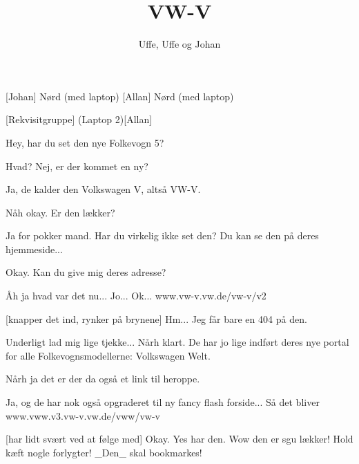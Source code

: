 \documentclass[a4paper,11pt]{article}
\title{VW-V}
\author{Uffe, Uffe og Johan}
\begin{document}
\maketitle

\begin{roles}
[Johan] Nørd (med laptop)
[Allan] Nørd (med laptop)
\end{roles}

\begin{props}
[Rekvisitgruppe]
\prop(Laptop 2)[Allan]
\end{props}

  
\begin{sketch}


 Hey, har du set den nye Folkevogn 5?

 Hvad? Nej, er der kommet en ny?

 Ja, de kalder den Volkswagen V, altså VW-V.

 Nåh okay. Er den lækker?

 Ja for pokker mand. Har du virkelig ikke set den? Du kan se den på
deres hjemmeside...

 Okay. Kan du give mig deres adresse?


 Åh ja hvad var det nu...  Jo... Ok...
www.vw-v.vw.de/vw-v/v2 

[knapper det ind, rynker på brynene] Hm... Jeg får bare en 404 på den.

 Underligt lad mig lige tjekke...  Nårh klart.
De har jo lige indført deres nye portal for alle Folkevognsmodellerne:
Volkswagen Welt.

 Nårh ja det er der da også et link til heroppe.


 Ja, og de har nok også opgraderet til ny fancy flash forside... Så
det bliver www.vww.v3.vw-v.vw.de/vww/vw-v

[har lidt svært ved at følge med] Okay. Yes har den. Wow den er sgu
lækker! Hold kæft nogle forlygter! \_Den\_ skal bookmarkes!


\end{sketch}
\end{document}
